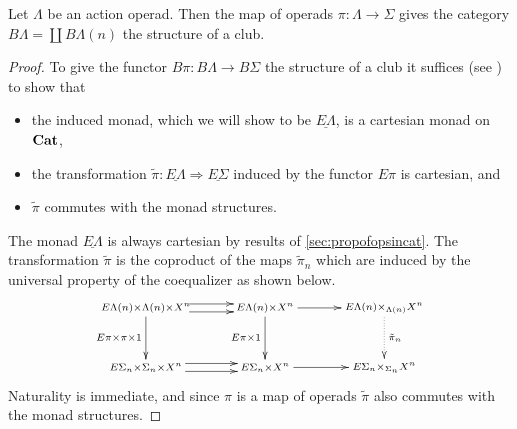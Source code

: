 \begin{thm}
Let $\Lambda$ be an action operad. Then the map of operads $\pi \colon \Lambda \rightarrow \Sigma$ gives the category $B\Lambda = \coprod B\Lambda(n)$ the structure of a club.
\end{thm}
\begin{proof}
To give the functor $B\pi \colon B\Lambda \rightarrow B \Sigma$ the structure of a club it suffices (see \cite{leinster}) to show that
\begin{itemize}
\item the induced monad, which we will show to be $\underline{E\Lambda}$, is a cartesian monad on $\mathbf{Cat}$,
\item the transformation $\tilde{\pi} \colon \underline{E\Lambda} \Rightarrow \underline{E\Sigma}$ induced by the functor $E\pi$ is cartesian, and
\item $\tilde{\pi}$ commutes with the monad structures.
\end{itemize}
The monad $\underline{E\Lambda}$ is always cartesian by results of \cref{sec:propofopsincat}. The transformation $\tilde{\pi}$ is the coproduct of the maps $\tilde{\pi}_{n}$ which are induced by the universal property of the coequalizer as shown below.
  \[
    \xy
      (0,0)*+{\scriptstyle E\Lambda(n) \times \Lambda(n) \times X^n} ="00";
      (0,-15)*+{\scriptstyle E\Sigma_{n} \times \Sigma_{n} \times X^n} ="01";
      (30,0)*+{\scriptstyle E\Lambda(n) \times X^n} ="10";
      (30,-15)*+{\scriptstyle E\Sigma_{n} \times X^n} ="11";
      (60,0)*+{\scriptstyle E\Lambda(n) \times_{\Lambda(n)} X^n} ="20";
      (60,-15)*+{\scriptstyle E\Sigma_{n} \times_{\Sigma_{n}}  X^n} ="21";
      {\ar (11,1)*{}; (22,1)*{} };
      {\ar (11,-1)*{}; (22,-1)*{} };
      {\ar_{E\pi \times \pi \times 1} "00" ; "01"};
      {\ar (10,-14)*{}; (23,-14)*{} };
      {\ar (10,-16)*{}; (23,-16)*{} };
      {\ar_{E\pi \times 1} "10" ; "11"};
      {\ar@{.>}^{\tilde{\pi}_{n}} "20" ; "21"};
      {\ar "10" ; "20"};
      {\ar "11" ; "21"};
    \endxy
  \]
Naturality is immediate, and since $\pi$ is a map of operads $\tilde{\pi}$ also commutes with the monad structures.


\end{proof}
